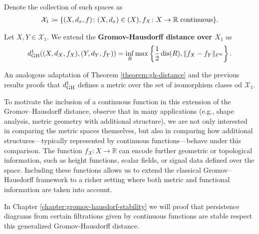 Denote the collection of such spaces as
\begin{align}
    \mathcal{X}_1 \coloneq \{ (X, d_x, f) \colon (X, d_x) \in \mathcal(X), f_X \colon X \to \mathbb R \text{ continuous}\}.
\end{align}

\begin{definition} \label{def:dgh1}
    Let $ X, Y \in \mathcal{X}_1 $. We extend the {\bf Gromov-Hausdorff distance over $ X_1 $} as
    \begin{equation}
        d_{\operatorname{GH}}^1((X, d_X, f_X), (Y, d_Y, f_Y)) = \inf_{R} \max \left\{ \frac{1}{2} \operatorname{dis}(R), \|f_X - f_Y \|_{\ell^\infty} \right\}.   
    \end{equation}
\end{definition}

An analogous adaptation of Theorem \ref{theorem:gh-distance} and the previous results proofs that $ d_{\operatorname{GH}}^1 $ defines a metric over the set of isomorphism clases od $ \mathcal{X}_1 $. 

To motivate the inclusion of a continuous function in this extension of the Gromov--Hausdorff distance, observe that in many applications (e.g., shape analysis, metric geometry with additional structure), we are not only interested in comparing the metric spaces themselves, but also in comparing how additional structures---typically represented by continuous functions---behave under this comparison. The function $f_X \colon X \to \mathbb{R}$ can encode further geometric or topological information, such as height functions, scalar fields, or signal data defined over the space. Including these functions allows us to extend the classical Gromov--Hausdorff framework to a richer setting where both metric and functional information are taken into account.

In Chapter \ref{chapter:gromov-hausdorf-stability} we will proof that persistence diagrams from certain filtrations given by continuous functions are stable respect this generalized Gromov-Hausdorff distance.